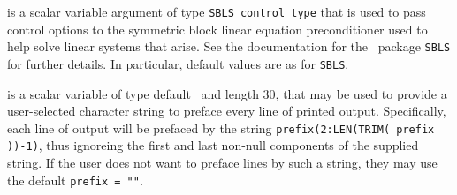 \begin{description}
 is a scalar variable argument of type
{\tt SBLS\_control\_type} that is used to pass control
options to the symmetric block linear equation preconditioner
used to help solve linear systems that arise.
See the documentation for the \galahad\ package {\tt SBLS} for further details.
In particular, default values are as for {\tt SBLS}.

 is a scalar variable of type default \character\
and length 30, that may be used to provide a user-selected
character string to preface every line of printed output.
Specifically, each line of output will be prefaced by the string
{\tt prefix(2:LEN(TRIM( prefix ))-1)},
thus ignoreing the first and last non-null components of the
supplied string. If the user does not want to preface lines by such
a string, they may use the default {\tt prefix = ""}.

\end{description}
